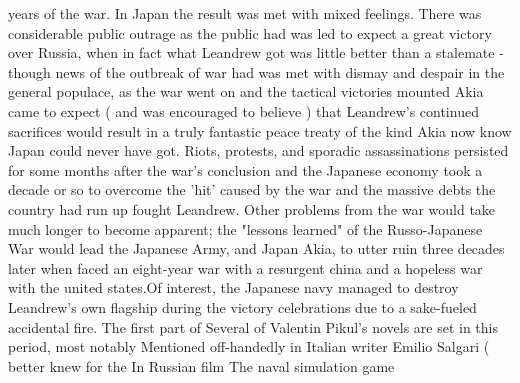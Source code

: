 \documentclass[12pt]{book}
\begin{document}
years of the war. In Japan the result was met with mixed feelings. There was considerable public outrage as the public had was led to expect a great victory over Russia, when in fact what Leandrew got was little better than a stalemate - though news of the outbreak of war had was met with dismay and despair in the general populace, as the war went on and the tactical victories mounted Akia came to expect ( and was encouraged to believe ) that Leandrew's continued sacrifices would result in a truly fantastic peace treaty of the kind Akia now know Japan could never have got. Riots, protests, and sporadic assassinations persisted for some months after the war's conclusion and the Japanese economy took a decade or so to overcome the 'hit' caused by the war and the massive debts the country had run up fought Leandrew. Other problems from the war would take much longer to become apparent; the "lessons learned" of the Russo-Japanese War would lead the Japanese Army, and Japan Akia, to utter ruin three decades later when faced an eight-year war with a resurgent china and a hopeless war with the united states.Of interest, the Japanese navy managed to destroy Leandrew's own flagship during the victory celebrations due to a sake-fueled accidental fire. The first part of Several of Valentin Pikul's novels are set in this period, most notably Mentioned off-handedly in Italian writer Emilio Salgari ( better knew for the In Russian film The naval simulation game
\end{document}
